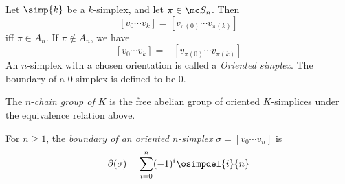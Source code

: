 \begin{definition}
  Let $\simp{k}$ be a $k$-simplex, and let $\pi \in \mc S_n$. Then
  \[
    [v_0 \cdots v_k] = [v_{\pi(0)} \cdots v_{\pi(k)}]
  \]
  iff $\pi \in A_n$. If $\pi \not\in A_n$, we have
  \[
    [v_0 \cdots v_k] = -[v_{\pi(0)} \cdots v_{\pi(k)}]
  \]
  An $n$-simplex with a chosen orientation is called a \emph{Oriented
    simplex}. The boundary of a $0$-simplex is defined to be $0$.
\end{definition}

\begin{definition}
  The $n$-\emph{chain group of $K$} is the free abelian group of
  oriented $K$-simplices under the equivalence relation above.
\end{definition}

\begin{definition}
  For $n \geq 1$, the \emph{boundary of an oriented $n$-simplex}
  $\sigma = [v_0 \cdots v_n]$ is
  \[
    \partial(\sigma) = \sum_{i=0}^n (-1)^i \osimpdel{i}{n}
  \]
\end{definition}

